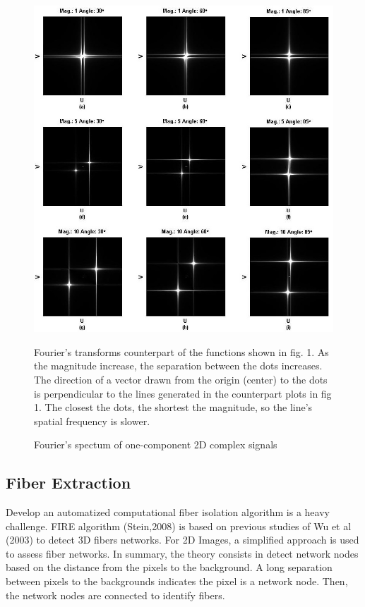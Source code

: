 \documentclass[12pt,a4paper]{article}
\begin{document}
\begin{figure}
  \includegraphics[width=\linewidth]{FiguresDisertation/figure2.jpg}
  \caption{Fourier's spectum of one-component 2D complex signals}
  \medskip
  \small
  Fourier’s transforms counterpart of the functions shown in fig. 1.  As the magnitude increase, the separation between the dots increases. The direction of a vector drawn from the origin (center) to the dots is perpendicular to the lines generated in the counterpart plots in fig 1. The closest the dots, the shortest the magnitude, so the line's spatial frequency is slower.
\end{figure}
\subsection{Fiber Extraction}
Develop an automatized computational fiber isolation algorithm is a heavy challenge. FIRE algorithm (Stein,2008) is based on previous studies of Wu et al (2003) to detect 3D fibers networks. For 2D Images, a simplified approach is used to assess fiber networks. In summary, the theory consists in detect network nodes based on the distance from the pixels to the background. A long separation between pixels to the backgrounds indicates the pixel is a network node. Then, the network nodes are connected to identify fibers. 
\end{document}
